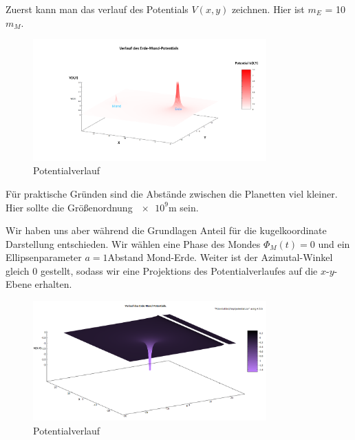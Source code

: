 \documentclass{subfiles}
\begin{document}
    Zuerst kann man das verlauf des Potentials $V(x,y)$ zeichnen. Hier ist $m_{E}$ = 10 \cdot $m_{M}$.
    \begin{figure}[H]
        \centering
        \includegraphics[width=0.8\textwidth]{../Ressource/PotentialVerlauf.png}
        \caption{Potentialverlauf}
        \label{fig:Potential}
    \end{figure}
    Für praktische Gründen sind die Abstände zwischen die Planetten viel kleiner. Hier sollte die Größenordnung $\num{e9}$m sein.\newline

    Wir haben uns aber während die Grundlagen Anteil für die kugelkoordinate Darstellung entschieden. Wir wählen eine Phase des Mondes
    $\Phi_M(t) = 0$ und ein Ellipsenparameter $a = 1$Abstand Mond-Erde. Weiter ist der Azimutal-Winkel gleich 0 gestellt, sodass wir eine Projektions
    des Potentialverlaufes auf die $x$-$y$-Ebene erhalten.
    \begin{figure}[H]
        \centering
        \includegraphics[width=0.8\textwidth]{../Ressource/PotentialVerlaufKugel.png}
        \caption{Potentialverlauf}
        \label{fig:Potential}
    \end{figure}
\end{document}
